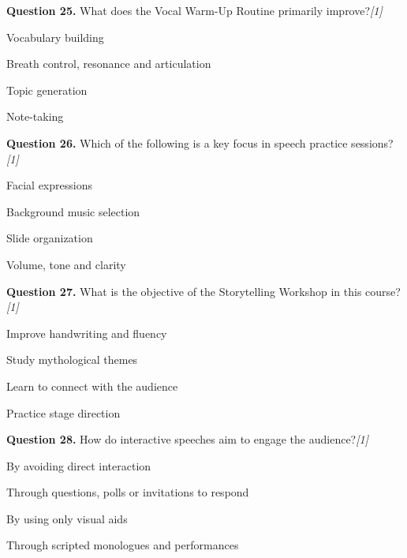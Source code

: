\documentclass[11pt,a4paper]{article}
\newcommand{\pts}[1]{\hfill   \textit{[#1]}}
\begin{document}
\medskip


\noindent   \textbf{Question 25.} What does the Vocal Warm-Up Routine primarily improve?\pts{1}

\begin{parts}
  \item Vocabulary building
  \item Breath control, resonance and articulation
  \item Topic generation
  \item Note-taking
\end{parts}

\medskip


\noindent   \textbf{Question 26.} Which of the following is a key focus in speech practice sessions?\pts{1}

\begin{parts}
  \item Facial expressions
  \item Background music selection
  \item Slide organization
  \item Volume, tone and clarity
\end{parts}

\medskip


\noindent   \textbf{Question 27.} What is the objective of the Storytelling Workshop in this course?\pts{1}

\begin{parts}
  \item Improve handwriting and fluency
  \item Study mythological themes
  \item Learn to connect with the audience
  \item Practice stage direction
\end{parts}

\medskip


\noindent   \textbf{Question 28.} How do interactive speeches aim to engage the audience?\pts{1}

\begin{parts}
  \item By avoiding direct interaction
  \item Through questions, polls or invitations to respond
  \item By using only visual aids
  \item Through scripted monologues and performances
\end{parts}

\medskip
\end{document}
